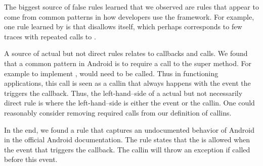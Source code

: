 \documentclass[10pt,reprint,nocopyrightspace,numbers]{sigplanconf}
\begin{document}

The biggest source of false rules learned that we observed are rules that appear to come from common patterns in how developers use the framework.
For example, one rule learned by \pfsa{} is that  disallows itself, which perhaps corresponds to few traces with repeated calls to .

A source of actual but not direct rules relates to callbacks and  calls. We found that a common pattern in Android is to require a call to the super method.  For example to implement ,  would need to be called.
Thus in functioning applications, this  call is seen as a callin that always happens with the event the triggers the  callback. Thus, the left-hand--side of a actual but not necessarily direct rule is where the left-hand--side is either the event or the  callin. One could reasonably consider removing required  calls from our definition of callins.

\newsavebox{\SBoxFragmentGetResource}

In the end, we found a rule that captures an undocumented behavior of Android in the official Android documentation.
The rule states that the \usebox{\SBoxFragmentGetResource} is allowed when the event  that triggers the  callback.
The  callin will throw an exception if called before this  event.
\end{document}
